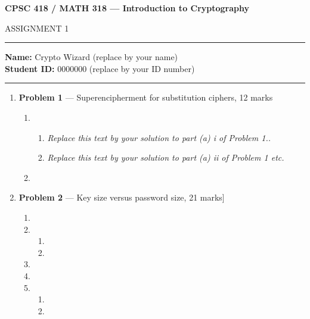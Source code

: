 \documentclass[11pt]{article}
\theoremstyle{definition}
\begin{document}
\begin{center}
{\bf \Large CPSC 418 / MATH 318 --- Introduction to Cryptography

ASSIGNMENT 1 %
}
\end{center}

\hrule 	

\textbf{Name:} Crypto Wizard (replace by your name) \\
\textbf{Student ID:} 0000000 (replace by your ID number)

\medskip \hrule

\begin{enumerate}

\item[] \textbf{Problem 1} --- Superencipherment for substitution ciphers, 12 marks

\begin{enumerate}
\item
\begin{enumerate}
\item \emph{Replace this text by your solution to part (a) i of Problem 1..}

\item \emph{Replace this text by your solution to part (a) ii of Problem 1 etc.}
\end{enumerate}

\item
\end{enumerate}

\newpage

\item[] \textbf{Problem 2} --- Key size versus password size, 21 marks]

\begin{enumerate}
\item
\item

\begin{enumerate}
\item
\item
\end{enumerate}

\item

\item

\item
\begin{enumerate}
\item

\item
\end{enumerate}
\end{enumerate}


\end{enumerate}
\end{document}
